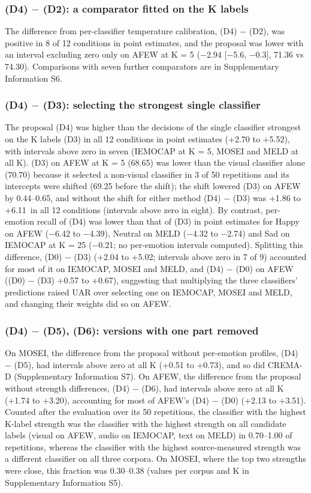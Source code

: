 \subsubsection{(D4) $-$ (D2): a comparator fitted on the K labels}\label{sec:rq2-temp}
The difference from per-classifier temperature calibration, (D4) $-$ (D2), was positive in 8 of 12 conditions in point estimates, and the proposal was lower with an interval excluding zero only on AFEW at K = 5 ($-$2.94 [$-$5.6, $-$0.3], 71.36 vs 74.30). Comparisons with seven further comparators are in Supplementary Information S6.

\subsubsection{(D4) $-$ (D3): selecting the strongest single classifier}\label{sec:rq2-single}
The proposal (D4) was higher than the decisions of the single classifier strongest on the K labels (D3) in all 12 conditions in point estimates (+2.70 to +5.52\pt), with intervals above zero in seven (IEMOCAP at K = 5, MOSEI and MELD at all K). (D3) on AFEW at K = 5 (68.65) was lower than the visual classifier alone (70.70) because it selected a non-visual classifier in 3 of 50 repetitions and its intercepts were shifted (69.25 before the shift); the shift lowered (D3) on AFEW by 0.44--0.65\pt, and without the shift for either method (D4) $-$ (D3) was +1.86 to +6.11\pt\ in all 12 conditions (intervals above zero in eight). By contrast, per-emotion recall of (D4) was lower than that of (D3) in point estimates for Happy on AFEW ($-$6.42 to $-$4.39\pt), Neutral on MELD ($-$4.32 to $-$2.74\pt) and Sad on IEMOCAP at K = 25 ($-$0.21\pt; no per-emotion intervals computed). Splitting this difference, (D0) $-$ (D3) (+2.04 to +5.02\pt; intervals above zero in 7 of 9) accounted for most of it on IEMOCAP, MOSEI and MELD, and (D4) $-$ (D0) on AFEW ((D0) $-$ (D3) +0.57 to +0.67\pt), suggesting that multiplying the three classifiers' predictions raised UAR over selecting one on IEMOCAP, MOSEI and MELD, and changing their weights did so on AFEW.

\subsubsection{(D4) $-$ (D5), (D6): versions with one part removed}\label{sec:rq2-ablation}
On MOSEI, the difference from the proposal without per-emotion profiles, (D4) $-$ (D5), had intervals above zero at all K (+0.51 to +0.73\pt), and so did CREMA-D (Supplementary Information S7). On AFEW, the difference from the proposal without strength differences, (D4) $-$ (D6), had intervals above zero at all K (+1.74 to +3.20\pt), accounting for most of AFEW's (D4) $-$ (D0) (+2.13 to +3.51\pt). Counted after the evaluation over its 50 repetitions, the classifier with the highest K-label strength was the classifier with the highest strength on all candidate labels (visual on AFEW, audio on IEMOCAP, text on MELD) in 0.70--1.00 of repetitions, whereas the classifier with the highest source-measured strength was a different classifier on all three corpora. On MOSEI, where the top two strengths were close, this fraction was 0.30--0.38 (values per corpus and K in Supplementary Information S5).

